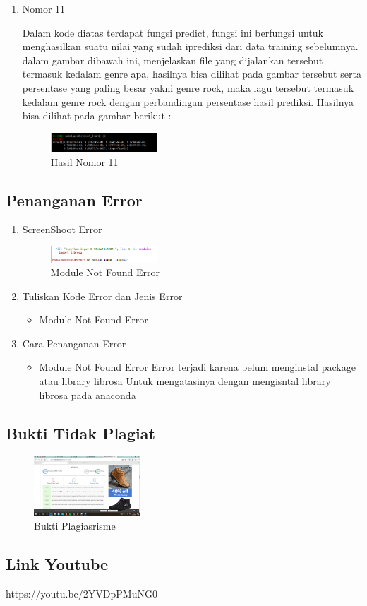 \begin{enumerate}
\item Nomor 11
\hfill\break
	
Dalam kode diatas terdapat fungsi predict, fungsi ini berfungsi untuk menghasilkan suatu nilai yang sudah iprediksi dari data training sebelumnya. dalam gambar dibawah ini, menjelaskan file yang dijalankan tersebut termasuk kedalam genre apa, hasilnya bisa dilihat pada gambar tersebut serta persentase yang paling besar yakni genre rock, maka lagu tersebut termasuk kedalam genre rock dengan perbandingan persentase hasil prediksi. Hasilnya bisa dilihat pada gambar berikut :
\hfill\break
	\begin{figure}[H]
		\includegraphics[width=4cm]{figures/1174054/6/40.png}
		\centering
		\caption{Hasil Nomor 11}
	\end{figure}
	
\end{enumerate}

\subsection{Penanganan Error}
\begin{enumerate}
\item ScreenShoot Error
	\begin{figure}[H]
		\includegraphics[width=4cm]{figures/1174054/6/error1.png}
		\centering
		\caption{Module Not Found Error}
	\end{figure}

	\item Tuliskan Kode Error dan Jenis Error
	\begin{itemize}
		\item Module Not Found Error

	\end{itemize}
	\item Cara Penanganan Error
	\begin{itemize}
		\item Module Not Found Error
		\hfill\break
		Error terjadi karena belum menginstal package atau library librosa Untuk mengatasinya dengan mengisntal library librosa pada anaconda
	\end{itemize}
\end{enumerate}


\subsection{Bukti Tidak Plagiat}
\begin{figure}[H]
	\includegraphics[width=4cm]{figures/1174054/6/plagiarisme.png}
	\centering
	\caption{Bukti Plagiasrisme}
\end{figure}

\subsection{Link Youtube}
https://youtu.be/2YVDpPMuNG0